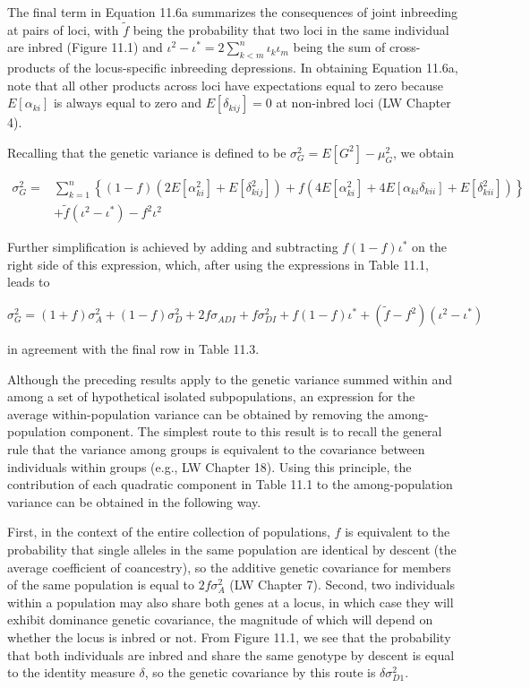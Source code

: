 \documentclass{article}
\begin{document}
The final term in Equation 11.6a summarizes the consequences of joint inbreeding at pairs of loci, with  $ \tilde{f} $ being the probability that two loci in the same individual are inbred (Figure 11.1) and  $ \iota^2 - \iota^* = 2 \sum_{k<m}^n \iota_{k}\iota_m $ being the sum of cross-products of the locus-specific inbreeding depressions. In obtaining Equation 11.6a, note that all other products across loci have expectations equal to zero because  $ E[\alpha_{ki}] $ is always equal to zero and  $ E[\delta_{kij}] = 0 $ at non-inbred loci (LW Chapter 4).

Recalling that the genetic variance is defined to be  $ \sigma_{G}^{2} = E[G^{2}] - \mu_{G}^{2} $, we obtain

\begin{equation}
\begin{align*}\sigma_{G}^{2}=&\sum_{k=1}^{n}\left\{(1-f)(2E[\alpha_{ki}^{2}]+E[\delta_{kij}^{2}])+f(4E[\alpha_{ki}^{2}]+4E[\alpha_{ki}\delta_{kii}]+E[\delta_{kii}^{2}])\right\}\\&+\widetilde{f}(\iota^{2}-\iota^{*})-f^{2}\iota^{2}\end{align*}
\tag{11.6b}
\label{eq:11_6b}
\end{equation}

Further simplification is achieved by adding and subtracting  $ f(1 - f)\iota^* $ on the right side of this expression, which, after using the expressions in Table 11.1, leads to

\begin{equation}
\sigma_{G}^{2}=(1+f)\sigma_{A}^{2}+(1-f)\sigma_{D}^{2}+2f\sigma_{ADI}+f\sigma_{DI}^{2}+f(1-f)\iota^{*}+(\widetilde{f}-f^{2})(\iota^{2}-\iota^{*})
\tag{11.6c}
\label{eq:11_6c}
\end{equation}

in agreement with the final row in Table 11.3.

Although the preceding results apply to the genetic variance summed within and among a set of hypothetical isolated subpopulations, an expression for the average within-population variance can be obtained by removing the among-population component. The simplest route to this result is to recall the general rule that the variance among groups is equivalent to the covariance between individuals within groups (e.g., LW Chapter 18). Using this principle, the contribution of each quadratic component in Table 11.1 to the among-population variance can be obtained in the following way.

First, in the context of the entire collection of populations, $f$ is equivalent to the probability that single alleles in the same population are identical by descent (the average coefficient of coancestry), so the additive genetic covariance for members of the same population is equal to $2f\sigma_A^2$ (LW Chapter 7). Second, two individuals within a population may also share both genes at a locus, in which case they will exhibit dominance genetic covariance, the magnitude of which will depend on whether the locus is inbred or not. From Figure 11.1, we see that the probability that both individuals are inbred and share the same genotype by descent is equal to the identity measure $\delta$, so the genetic covariance by this route is $\delta\sigma_{D1}^2$.
\end{document}
